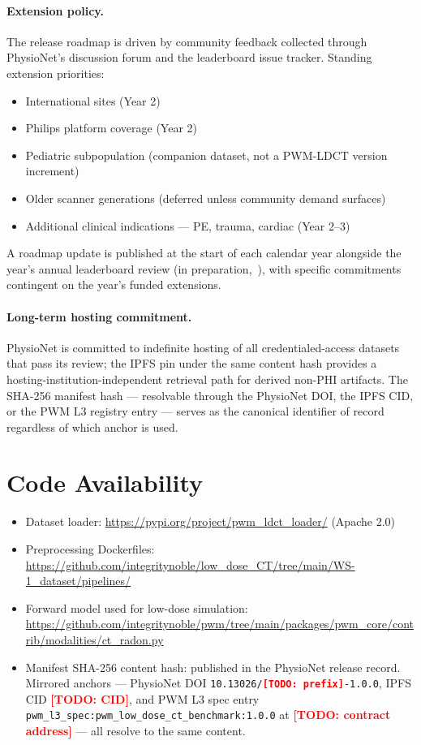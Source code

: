 \documentclass[twoside,11pt]{article}
\newcommand{\todo}[1]{\textcolor{red}{\textbf{[TODO: #1]}}}
\begin{document}
\paragraph{Extension policy.} The release roadmap is driven by community feedback collected through PhysioNet's discussion forum and the leaderboard issue tracker. Standing extension priorities:

\begin{itemize}
    \item International sites (Year 2)
    \item Philips platform coverage (Year 2)
    \item Pediatric subpopulation (companion dataset, not a PWM-LDCT version increment)
    \item Older scanner generations (deferred unless community demand surfaces)
    \item Additional clinical indications --- PE, trauma, cardiac (Year 2--3)
\end{itemize}

A roadmap update is published at the start of each calendar year alongside the year's annual leaderboard review (in preparation,~\citealt{ws4leaderboard}), with specific commitments contingent on the year's funded extensions.

\paragraph{Long-term hosting commitment.} PhysioNet is committed to indefinite hosting of all credentialed-access datasets that pass its review; the IPFS pin under the same content hash provides a hosting-institution-independent retrieval path for derived non-PHI artifacts. The SHA-256 manifest hash --- resolvable through the PhysioNet DOI, the IPFS CID, or the PWM L3 registry entry --- serves as the canonical identifier of record regardless of which anchor is used.

\section*{Code Availability}

\begin{itemize}
    \item Dataset loader: \url{https://pypi.org/project/pwm_ldct_loader/} (Apache 2.0)
    \item Preprocessing Dockerfiles: \url{https://github.com/integritynoble/low_dose_CT/tree/main/WS-1_dataset/pipelines/}
    \item Forward model used for low-dose simulation: \url{https://github.com/integritynoble/pwm/tree/main/packages/pwm_core/contrib/modalities/ct_radon.py}
    \item Manifest SHA-256 content hash: published in the PhysioNet release record. Mirrored anchors --- PhysioNet DOI \texttt{10.13026/\todo{prefix}-1.0.0}, IPFS CID \todo{CID}, and PWM L3 spec entry \texttt{pwm\_l3\_spec:pwm\_low\_dose\_ct\_benchmark:1.0.0} at \todo{contract address} --- all resolve to the same content.
\end{itemize}
\end{document}
